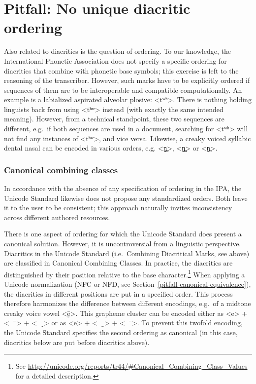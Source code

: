 \section{Pitfall: No unique diacritic ordering}
\label{pitfall-no-unique-diacritic-ordering}

Also related to diacritics is the question of ordering. To our knowledge, the
International Phonetic Association does not specify a specific ordering for
diacritics that combine with phonetic base symbols; this exercise is left to the
reasoning of the transcriber. However, such marks have to be explicitly ordered
if sequences of them are to be interoperable and compatible computationally. An example is a
labialized aspirated alveolar plosive: <tʷʰ>. There is nothing holding linguists
back from using <tʰʷ> instead (with exactly the same intended meaning). However,
from a technical standpoint, these two sequences are different, e.g.~if both
sequences are used in a document, searching for <tʷʰ> will not find any
instances of <tʰʷ>, and vice versa. Likewise, a creaky voiced syllabic dental
nasal can be encoded in various orders, e.g. <n̪̰̩>, <n̩̰̪> or <n̩̪̰>.

\subsubsection*{Canonical combining classes}

In accordance with the absence of any specification of ordering in the IPA, the
Unicode Standard likewise does not propose any standardized orders. Both leave it
to the user to be consistent; this approach naturally invites inconsistency across 
different authored resources.

There is one aspect of ordering for which
the Unicode Standard does present a canonical solution. However, it is uncontroversial
from a linguistic perspective. Diacritics in the Unicode Standard
(i.e.~Combining Diacritical Marks, see above) are classified in Canonical
Combining Classes. In practice, the diacritics are distinguished by their
position relative to the base character.\footnote{See
\url{http://unicode.org/reports/tr44/\#Canonical\_Combining\_Class\_Values} for a
detailed description.} When applying a Unicode normalization (NFC or NFD, see
Section~\ref{pitfall-canonical-equivalence}), the diacritics in different
positions are put in a specified order. This process therefore harmonizes the
difference between different encodings, e.g.\ of a midtone creaky voice
vowel <ḛ̄>. This grapheme cluster can be encoded either as <e> + <\ \ ̄> + <\ \
̰> or as <e> + <\ \ ̰> + <\ \ ̄>. To prevent this twofold encoding, the Unicode
Standard specifies the second ordering as canonical (in this case, diacritics
below are put before diacritics above).

